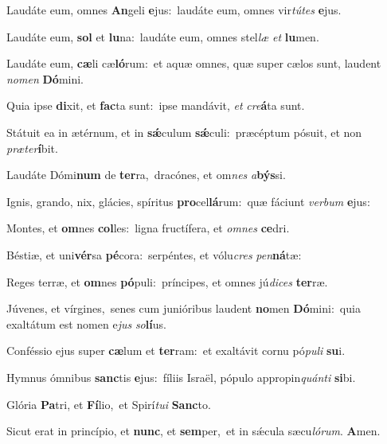 Laudáte eum, omnes \textbf{An}geli \textbf{e}jus:~\redgreheightstar laudáte eum, omnes vir\textit{tú}\textit{tes} \textbf{e}jus.

Laudáte eum, \textbf{sol} et \textbf{lu}na:~\redgreheightstar laudáte eum, omnes stel\textit{læ} \textit{et} \textbf{lu}men.

Laudáte eum, \textbf{cæ}li cæ\textbf{ló}rum:~\redgreheightstar et aquæ omnes, quæ super cælos sunt, laudent \textit{no}\textit{men} \textbf{Dó}mini.

Quia ipse \textbf{di}xit, et \textbf{fac}ta sunt:~\redgreheightstar ipse mandávit, \textit{et} \textit{cre}\textbf{á}ta sunt.

Státuit ea in ætérnum, et in \textbf{sǽ}culum \textbf{sǽ}culi:~\redgreheightstar præcéptum pósuit, et non \textit{præ}\textit{ter}\textbf{í}bit.

Laudáte Dómi\textbf{num} de \textbf{ter}ra,~\redgreheightstar dracónes, et om\textit{nes} \textit{a}\textbf{býs}si.

Ignis, grando, nix, glácies, spíritus \textbf{pro}cel\textbf{lá}rum:~\redgreheightstar quæ fáciunt \textit{ver}\textit{bum} \textbf{e}jus:

Montes, et \textbf{om}nes \textbf{col}les:~\redgreheightstar ligna fructífera, et \textit{om}\textit{nes} \textbf{ce}dri.

Béstiæ, et uni\textbf{vér}sa \textbf{pé}cora:~\redgreheightstar serpéntes, et vólu\textit{cres} \textit{pen}\textbf{ná}tæ:

Reges terræ, et \textbf{om}nes \textbf{pó}puli:~\redgreheightstar príncipes, et omnes jú\textit{di}\textit{ces} \textbf{ter}ræ.

Júvenes, et vírgines,~\reddagger senes cum junióribus laudent \textbf{no}men \textbf{Dó}mini:~\redgreheightstar quia exaltátum est nomen e\textit{jus} \textit{so}\textbf{lí}us.

Conféssio ejus super \textbf{cæ}lum et \textbf{ter}ram:~\redgreheightstar et exaltávit cornu pó\textit{pu}\textit{li} \textbf{su}i.

Hymnus ómnibus \textbf{sanc}tis \textbf{e}jus:~\redgreheightstar fíliis Israël, pópulo appropin\textit{quán}\textit{ti} \textbf{si}bi.

Glória \textbf{Pa}tri, et \textbf{Fí}lio,~\redgreheightstar et Spirí\textit{tu}\textit{i} \textbf{Sanc}to.

Sicut erat in princípio, et \textbf{nunc}, et \textbf{sem}per,~\redgreheightstar et in sǽcula sæcu\textit{ló}\textit{rum}. \textbf{A}men.
